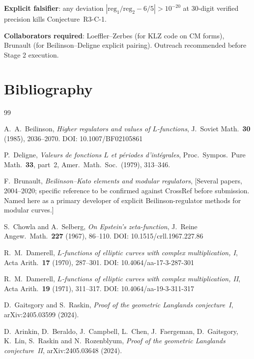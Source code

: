 \documentclass[12pt]{amsart}
\theoremstyle{definition}
\begin{document}
\textbf{Explicit falsifier}: any deviation $|\mathrm{reg}_{1}/\mathrm{reg}_{2} - 6/5| > 10^{-20}$
at 30-digit verified precision kills Conjecture~R3-C-1.

\textbf{Collaborators required}: Loeffler--Zerbes (for KLZ code on CM forms),
Brunault (for Beilinson--Deligne explicit pairing).  Outreach recommended before
Stage 2 execution.

\section{Bibliography}
\label{sec:bib}

\begin{thebibliography}{99}

A.~A.~Beilinson,
\emph{Higher regulators and values of $L$-functions},
J.\ Soviet Math.\ \textbf{30} (1985), 2036--2070.
DOI: 10.1007/BF02105861

P.~Deligne,
\emph{Valeurs de fonctions $L$ et p\'eriodes d'int\'egrales},
Proc.\ Sympos.\ Pure Math.\ \textbf{33}, part~2,
Amer.\ Math.\ Soc.\ (1979), 313--346.

F.~Brunault,
\emph{Beilinson--Kato elements and modular regulators},
[Several papers, 2004--2020; specific reference to be confirmed against
CrossRef before submission.  Named here as a primary developer of explicit
Beilinson-regulator methods for modular curves.]

S.~Chowla and A.~Selberg,
\emph{On Epstein's zeta-function},
J.\ Reine Angew.\ Math.\ \textbf{227} (1967), 86--110.
DOI: 10.1515/crll.1967.227.86

R.~M.~Damerell,
\emph{$L$-functions of elliptic curves with complex multiplication, I},
Acta Arith.\ \textbf{17} (1970), 287--301.
DOI: 10.4064/aa-17-3-287-301

R.~M.~Damerell,
\emph{$L$-functions of elliptic curves with complex multiplication, II},
Acta Arith.\ \textbf{19} (1971), 311--317.
DOI: 10.4064/aa-19-3-311-317

D.~Gaitsgory and S.~Raskin,
\emph{Proof of the geometric Langlands conjecture~I},
arXiv:2405.03599 (2024).

D.~Arinkin, D.~Beraldo, J.~Campbell, L.~Chen, J.~Faergeman,
D.~Gaitsgory, K.~Lin, S.~Raskin and N.~Rozenblyum,
\emph{Proof of the geometric Langlands conjecture~II},
arXiv:2405.03648 (2024).


\end{thebibliography}
\end{document}
